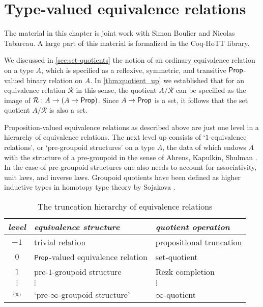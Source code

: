 \chapter{Type-valued equivalence relations}\label{chap:giraud}

The material in this chapter is joint work with Simon Boulier and Nicolas Tabareau. A large part of this material is formalized in the Coq-HoTT library.

We discussed in \cref{sec:set-quotients} the notion of an ordinary equivalence relation on a type $A$, which is specified as a reflexive, symmetric, and transitive $\mathsf{Prop}$-valued binary relation on $A$. In \cref{thm:quotient_up} we established that for an equivalence relation $\mathcal{R}$ in this sense, the quotient $A/\mathcal{R}$ can be specified as the image of $\mathcal{R}:A\to (A\to \mathsf{Prop})$. Since $A\to \mathsf{Prop}$ is a set, it follows that the set quotient $A/\mathcal{R}$ is also a set. 

Proposition-valued equivalence relations as described above are just one level in a hierarchy of equivalence relations. The next level up consists of `$1$-equivalence relations', or `pre-groupoid structures' on a type $A$, the data of which endows $A$ with the structure of a pre-groupoid in the sense of Ahrens, Kapulkin, Shulman \cite{AhrensKapulkinShulman}. In the case of pre-groupoid structures one also needs to account for associativity, unit laws, and inverse laws. Groupoid quotients have been defined as higher inductive types in homotopy type theory by Sojakova \cite{SojakovaPhD}.

\begin{table}\label{tab:hierarchy}
\caption{The truncation hierarchy of equivalence relations}
\centering
\begin{tabular}{cll}
\toprule
\emph{level} & \emph{equivalence structure} & \emph{quotient operation} \\
\midrule
$-1$ & trivial relation & propositional truncation \\
$0$ & $\mathsf{Prop}$-valued equivalence relation & set-quotient \\
$1$ & pre-$1$-groupoid structure & Rezk completion \\
$\vdots$ & \qquad$\vdots$ & \qquad$\vdots$ \\
$\infty$ & `pre-$\infty$-groupoid structure' & $\infty$-quotient \\
\bottomrule
\end{tabular}
\end{table}

